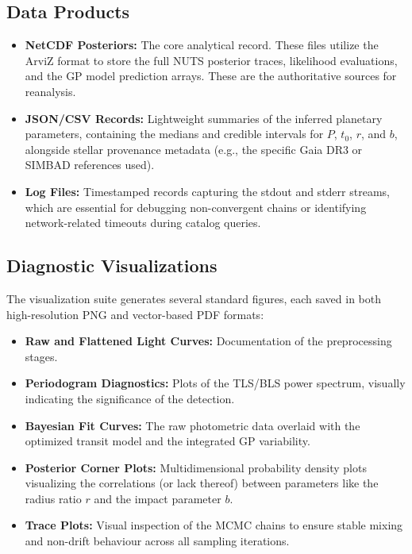 \documentclass[12pt,a4paper,oneside]{report}
\newcommand{\Porb}{\ensuremath{P}}
\newcommand{\tzero}{\ensuremath{t_{0}}}
\begin{document}
\subsection{Data Products}
\begin{itemize}
    \item \textbf{NetCDF Posteriors:} The core analytical record. These files utilize the ArviZ format to store the full NUTS posterior traces, likelihood evaluations, and the GP model prediction arrays. These are the authoritative sources for reanalysis.
    \item \textbf{JSON/CSV Records:} Lightweight summaries of the inferred planetary parameters, containing the medians and credible intervals for \Porb, \tzero, \(r\), and \(b\), alongside stellar provenance metadata (e.g., the specific Gaia DR3 or SIMBAD references used).
    \item \textbf{Log Files:} Timestamped records capturing the stdout and stderr streams, which are essential for debugging non-convergent chains or identifying network-related timeouts during catalog queries.
\end{itemize}

\subsection{Diagnostic Visualizations}
The visualization suite generates several standard figures, each saved in both high-resolution PNG and vector-based PDF formats:
\begin{itemize}
    \item \textbf{Raw and Flattened Light Curves:} Documentation of the preprocessing stages.
    \item \textbf{Periodogram Diagnostics:} Plots of the TLS/BLS power spectrum, visually indicating the significance of the detection.
    \item \textbf{Bayesian Fit Curves:} The raw photometric data overlaid with the optimized transit model and the integrated GP variability.
    \item \textbf{Posterior Corner Plots:} Multidimensional probability density plots visualizing the correlations (or lack thereof) between parameters like the radius ratio \(r\) and the impact parameter \(b\).
    \item \textbf{Trace Plots:} Visual inspection of the MCMC chains to ensure stable mixing and non-drift behaviour across all sampling iterations.
\end{itemize}
\end{document}
